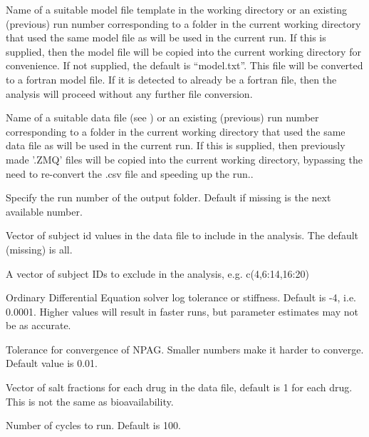 \documentclass[a4paper]{book}
\begin{document}
\begin{Arguments}
\begin{ldescription}
\item[\code{model}] Name of a suitable model file template in the working directory or
an existing (previous) run number corresponding to a folder in the current working directory that used the same model file as will be used in the current run.
If this is supplied, then the model file will be copied into the current 
working directory for convenience.  If not supplied, 
the default is ``model.txt''.  This file will be converted to a fortran model file.
If it is detected to already be a fortran file, then the analysis will proceed without any further
file conversion.

\item[\code{data}] Name of a suitable data file (see ) or
an existing (previous) run number corresponding to a folder in the current working directory that used the same data file as will be used in the current run.
If this is supplied, then previously made  '.ZMQ' files will be copied into the current 
working directory, bypassing the need to re-convert the .csv file and speeding up the run..

\item[\code{run}] Specify the run number of the output folder.  Default if missing is the next available number.

\item[\code{include}] Vector of subject id values in the data file to include in the analysis.  The default (missing) is all.

\item[\code{exclude}] A vector of subject IDs to exclude in the analysis, e.g. c(4,6:14,16:20)

\item[\code{ode}] Ordinary Differential Equation solver log tolerance or stiffness.  Default is -4, i.e. 0.0001.  Higher values will result in faster
runs, but parameter estimates may not be as accurate.

\item[\code{tol}] Tolerance for convergence of NPAG.  Smaller numbers make it harder to converge.
Default value is 0.01.

\item[\code{salt}] Vector of salt fractions for each drug in the data file, default is 1 for each drug.  This is not the same as bioavailability.

\item[\code{cycles}] Number of cycles to run. Default is 100.


\end{ldescription}
\end{Arguments}
\end{document}
